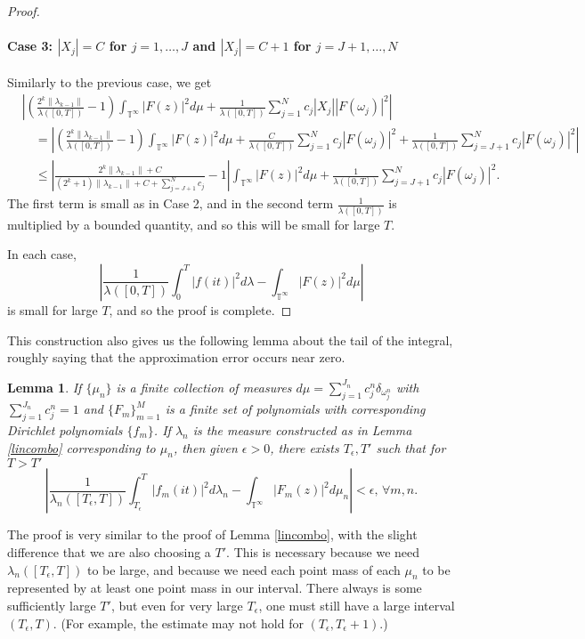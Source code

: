 \documentclass[]{elsarticle}
\newcommand{\T}{\mathbb{T}}
\numberwithin{equation}{section}
\newtheorem{lemma}{Lemma}
\begin{document}
\begin{proof}
          \paragraph{Case 3: $|X_j|=C$ for $j=1,\dots,J$ and $|X_j|=C+1$ for $j=J+1,\dots,N$} Similarly to the previous case, we get
          \begin{align*}
            &\left|\left(\frac{2^k \|\lambda_{k-1}\|}{\lambda([0,T])} - 1 \right)\int_{\T^{\infty}}|F(z)|^2d\mu
                 +\frac{1}{\lambda([0,T])}\sum_{j=1}^{N}c_j |X_j||F(\omega_j)|^2\right|\\
              &\quad=\left|\left(\frac{2^k \|\lambda_{k-1}\|}{\lambda([0,T])} - 1 \right)\int_{\T^{\infty}}|F(z)|^2d\mu
                 +\frac{C}{\lambda([0,T])}\sum_{j=1}^{N}c_j|F(\omega_j)|^2 
                 +\frac{1}{\lambda([0,T])}\sum_{j=J+1}^{N}c_j|F(\omega_j)|^2\right|\\
              &\quad\leq \left|\frac{2^k \|\lambda_{k-1}\|+C}{(2^k+1)\|\lambda_{k-1}\| +C+ \sum_{j=J+1}^{N}c_j} - 1 \right|\int_{\T^{\infty}}|F(z)|^2d\mu
                +\frac{1}{\lambda([0,T])}\sum_{j=J+1}^{N}c_j|F(\omega_j)|^2.
          \end{align*}
          The first term is small as in Case 2, and in the second term $\frac{1}{\lambda([0,T])}$ is multiplied by a bounded quantity, and so this will be small for large $T$.

          In each case, 
            $$\left|\frac{1}{\lambda([0,T])} \int_{0}^{T} |f(it)|^2 d\lambda - \int_{\T^{\infty}}|F(z)|^2d\mu \right| $$
          is small for large $T$, and so the proof is complete.
      \end{proof}

      This construction also gives us the following lemma about the tail of the integral, roughly saying that the approximation error occurs near zero.
      \begin{lemma}\label{Tepsilon}
        If $\{\mu_n\}$ is a finite collection of measures $d\mu = \sum_{j=1}^{J_n} c_j^n \delta_{\omega_j^n}$ with $\sum_{j=1}^{J_n} c_j^n = 1$ and $\{F_m\}_{m=1}^M$ is a finite set of polynomials with corresponding Dirichlet polynomials $\{f_m\}$. If $\lambda_n$ is the measure constructed as in Lemma \ref{lincombo} corresponding to $\mu_n$, then given $\epsilon>0$, there exists $T_\epsilon, T'$ such that for $T>T'$
          $$\left|\frac{1}{\lambda_n([T_\epsilon,T])} \int_{T_\epsilon}^{T} |f_m(it)|^2 d\lambda_n-\int_{\T^{\infty}}|F_m(z)|^2d\mu_n\right|<\epsilon,\, \forall m,n.$$
      \end{lemma}
        The proof is very similar to the proof of Lemma \ref{lincombo}, with the slight difference that we are also choosing a $T'$. This is necessary because we need $\lambda_n([T_\epsilon,T])$ to be large, and because we need each point mass of each $\mu_n$ to be represented by at least one point mass in our interval. There always is some sufficiently large $T'$, but even for very large $T_\epsilon$, one must still have a large interval $(T_\epsilon, T)$. (For example, the estimate may not hold for $(T_\epsilon, T_\epsilon +1)$.)
\end{document}
